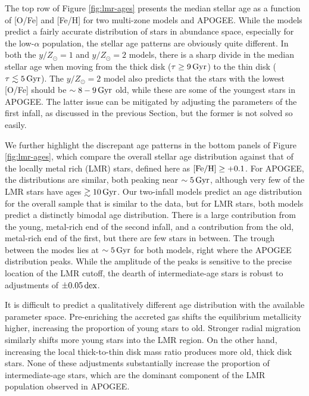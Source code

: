 \documentclass[twocolumn,twocolappendix,linenumbers]{aastex631}
\newcommand{\mathFeH}{{\rm [Fe/H]}}
\newcommand{\yZ}[1]{$y/Z_\odot=#1$}
\newcommand{\Gyr}{\,{\rm Gyr}}
\newcommand{\dex}{\,{\rm dex}}
\begin{document}
The top row of Figure \ref{fig:lmr-ages} presents the median stellar age as a function of [O/Fe] and [Fe/H] for two multi-zone models and APOGEE. While the models predict a fairly accurate distribution of stars in abundance space, especially for the low-$\alpha$ population, the stellar age patterns are obviously quite different. In both the \yZ{1} and \yZ{2} models, there is a sharp divide in the median stellar age when moving from the thick disk ($\tau\ge9\Gyr$) to the thin disk ($\tau\lesssim5\Gyr$). The \yZ{2} model also predicts that the stars with the lowest [O/Fe] should be $\sim8-9\Gyr$ old, while these are some of the youngest stars in APOGEE. The latter issue can be mitigated by adjusting the parameters of the first infall, as discussed in the previous Section, but the former is not solved so easily.

We further highlight the discrepant age patterns in the bottom panels of Figure \ref{fig:lmr-ages}, which compare the overall stellar age distribution against that of the locally metal rich (LMR) stars, defined here as $\mathFeH\ge+0.1$. 
For APOGEE, the distributions are similar, both peaking near $\sim5\Gyr$, although very few of the LMR stars have ages $\gtrsim10\Gyr$. Our two-infall models predict an age distribution for the overall sample that is similar to the data, but for LMR stars, both models predict a distinctly bimodal age distribution. There is a large contribution from the young, metal-rich end of the second infall, and a contribution from the old, metal-rich end of the first, but there are few stars in between. The trough between the modes lies at $\sim5\Gyr$ for both models, right where the APOGEE distribution peaks. While the amplitude of the peaks is sensitive to the precise location of the LMR cutoff, the dearth of intermediate-age stars is robust to adjustments of $\pm0.05\dex$.

It is difficult to predict a qualitatively different age distribution with the available parameter space. Pre-enriching the accreted gas shifts the equilibrium metallicity higher, increasing the proportion of young stars to old. Stronger radial migration similarly shifts more young stars into the LMR region. On the other hand, increasing the local thick-to-thin disk mass ratio produces more old, thick disk stars. None of these adjustments substantially increase the proportion of intermediate-age stars, which are the dominant component of the LMR population observed in APOGEE.
\end{document}
